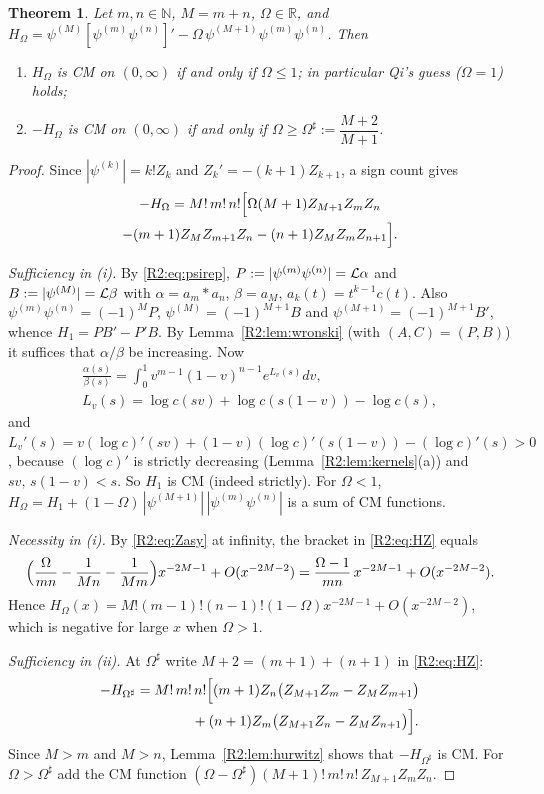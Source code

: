 \documentclass[11pt]{amsart}
\newtheorem{theorem}{Theorem}[section]
\theoremstyle{definition}
\theoremstyle{remark}
\begin{document}
\begin{theorem}\label{R2:thm:A}
Let $m,n\in\mathbb N$, $M=m+n$, $\Omega\in\mathbb R$, and
$H_\Omega=\psi^{(M)}[\psi^{(m)}\psi^{(n)}]'-\Omega\,\psi^{(M+1)}\psi^{(m)}\psi^{(n)}$.
Then
\begin{enumerate}
\item[(i)] $H_\Omega$ is CM on $(0,\infty)$ if and only if $\Omega\le1$; in
 particular Qi's guess ($\Omega=1$) holds;
\item[(ii)] $-H_\Omega$ is CM on $(0,\infty)$ if and only if
 $\Omega\ge\Omega^\sharp:=\dfrac{M+2}{M+1}$.
\end{enumerate}
\end{theorem}

\begin{proof}
Since $|\psi^{(k)}|=k!Z_k$ and $Z_k'=-(k+1)Z_{k+1}$, a sign count gives
\begin{multline}\label{R2:eq:HZ}
 -H_\Omega=M!\,m!\,n!\Bigl[\Omega(M+1)Z_{M+1}Z_mZ_n\\
 -(m+1)Z_MZ_{m+1}Z_n-(n+1)Z_MZ_mZ_{n+1}\Bigr].
\end{multline}

\emph{Sufficiency in (i).} By \eqref{R2:eq:psirep},
$P:=|\psi^{(m)}\psi^{(n)}|=\mathcal{L}\alpha$ and $B:=|\psi^{(M)}|=\mathcal{L}\beta$
with $\alpha=a_m*a_n$, $\beta=a_M$, $a_k(t)=t^{k-1}c(t)$. Also
$\psi^{(m)}\psi^{(n)}=(-1)^MP$, $\psi^{(M)}=(-1)^{M+1}B$ and
$\psi^{(M+1)}=(-1)^{M+1}B'$, whence $H_1=PB'-P'B$. By
Lemma~\ref{R2:lem:wronski} (with $(A,C)=(P,B)$) it suffices that
$\alpha/\beta$ be increasing. Now
\begin{gather*}
 \frac{\alpha(s)}{\beta(s)}=\int_0^1v^{m-1}(1-v)^{n-1}e^{L_v(s)}dv,\\
 L_v(s)=\log c(sv)+\log c(s(1-v))-\log c(s),
\end{gather*}
and $L_v'(s)=v(\log c)'(sv)+(1-v)(\log c)'(s(1-v))-(\log c)'(s)>0$,
because $(\log c)'$ is strictly decreasing (Lemma~\ref{R2:lem:kernels}(a))
and $sv,\,s(1-v)<s$. So $H_1$ is CM (indeed strictly). For $\Omega<1$,
$H_\Omega=H_1+(1-\Omega)\,|\psi^{(M+1)}|\,|\psi^{(m)}\psi^{(n)}|$ is a sum
of CM functions.

\emph{Necessity in (i).} By \eqref{R2:eq:Zasy} at infinity, the bracket in
\eqref{R2:eq:HZ} equals
\[
 \Bigl(\frac{\Omega}{mn}-\frac{1}{Mn}-\frac{1}{Mm}\Bigr)x^{-2M-1}+O(x^{-2M-2})
 =\frac{\Omega-1}{mn}\,x^{-2M-1}+O(x^{-2M-2}).
\]
Hence $H_\Omega(x)=M!(m-1)!(n-1)!(1-\Omega)x^{-2M-1}+O(x^{-2M-2})$, which is
negative for large $x$ when $\Omega>1$.

\emph{Sufficiency in (ii).} At $\Omega^\sharp$ write $M+2=(m+1)+(n+1)$ in
\eqref{R2:eq:HZ}:
\begin{align*}
 -H_{\Omega^\sharp}&=M!\,m!\,n!\Bigl[(m+1)Z_n\bigl(Z_{M+1}Z_m-Z_MZ_{m+1}\bigr)\\
 &\qquad\qquad+(n+1)Z_m\bigl(Z_{M+1}Z_n-Z_MZ_{n+1}\bigr)\Bigr].
\end{align*}
Since $M>m$ and $M>n$, Lemma~\ref{R2:lem:hurwitz} shows that
$-H_{\Omega^\sharp}$ is CM. For $\Omega>\Omega^\sharp$ add the CM function
$(\Omega-\Omega^\sharp)(M+1)!\,m!\,n!\,Z_{M+1}Z_mZ_n$.


\end{proof}
\end{document}
